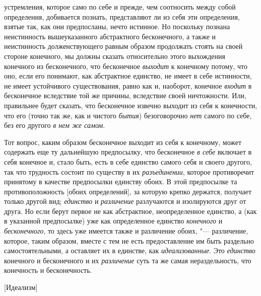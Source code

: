 устремления, которое само по себе и прежде, чем соотносить между собой
определения, добивается познать, представляют ли из себя эти определения,
взятые так, как они предпосланы, нечто истинное. Но поскольку познана
неистинность вышеуказанного абстрактного бесконечного, а также и
неистинность долженствующего равным образом продолжать стоять на своей
стороне конечного, мы должны сказать относительно этого выхождения
конечного из бесконечного, что бесконечное
{\em выходит} к конечному потому, что оно, если его
понимают, как абстрактное единство, не имеет в себе истинности, не имеет
устойчивого существования, равно как и, наоборот, конечное
{\em входит} в бесконечное вследствие той же причины,
вследствие своей ничтожности. Или, правильнее будет сказать, что
бесконечное извечно выходит из себя к конечности, что его (точно так же,
как и чистого {\em бытия}) безоговорочно
{\em нет} самого по себе, без его другого {\em в нем же самом}.

Тот вопрос, каким образом бесконечное выходит из себя к конечному, может
содержать еще ту дальнейшую предпосылку, что бесконечное
{\em в себе} включает в себя конечное и, стало быть,
есть в себе единство самого себя и своего другого, так что трудность
состоит по существу в их {\em разъединении}, которое
противоречит принятому в качестве предпосылки единству обоих. В этой
предпосылке та противоположность [обоих определений], за которую крепко
держатся, получает только другой вид; {\em единство} и
{\em различение} разлучаются и изолируются друг от
друга. Но если берут первое не как абстрактное, неопределенное единство, а
(как в указанной предпосылке) уже как определенное единство
{\em конечного} и {\em бесконечного}, то здесь уже имеется также и
различение обоих, "--- различение, которое, таким образом, вместе с тем не
есть предоставление им быть раздельно самостоятельными, а оставляет их в
единстве, как {\em идеализованные}. Это {\em единство} конечного и
бесконечного и их {\em различение} суть та же самая нераздельность,
что конечность и бесконечность.

%
  {[Идеализм]}

